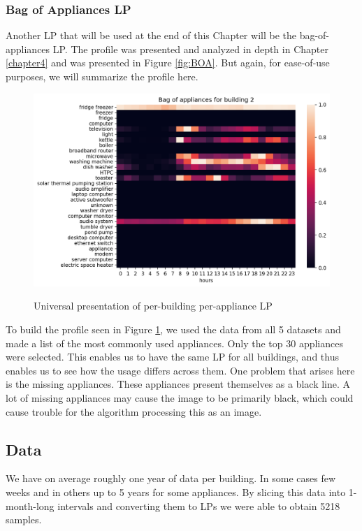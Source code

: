 \subsubsection{Bag of Appliances LP}

Another LP that will be used at the end of this Chapter will be the bag-of-appliances LP.
The profile was presented and analyzed in depth in Chapter \ref{chapter4} and was presented in Figure \ref{fig:BOA}.
But again, for ease-of-use purposes, we will summarize the profile here.

\begin{figure}[H]
	\centering
	\caption{Universal presentation of per-building per-appliance LP}
	\includegraphics[width=1\textwidth]{../Figures/LPS/BOA.png}
	\label{fig:BOA2}
\end{figure}

To build the profile seen in Figure \ref{fig:BOA2}, we used the data from all 5 datasets and made a list of the most commonly used appliances.
Only the top 30 appliances were selected.
This enables us to have the same LP for all buildings, and thus enables us to see how the usage differs across them.
One problem that arises here is the missing appliances.
These appliances present themselves as a black line.
A lot of missing appliances may cause the image to be primarily black,
which could cause trouble for the algorithm processing this as an image.

\subsection{Data}

We have on average roughly one year of data per building. 
In some cases few weeks and in others up to 5 years for some appliances.
By slicing this data into 1-month-long intervals and converting them to LPs we were able to obtain 5218 samples.

